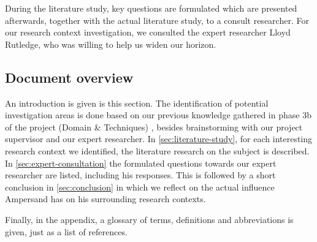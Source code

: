 During the literature study, key questions are formulated which are presented afterwards, together with the actual literature study, to a consult researcher.
For our research context investigation, we consulted the expert researcher Lloyd Rutledge, who was willing to help us widen our horizon.


\subsection{Document overview}
An introduction is given is this section.
The identification of potential investigation areas is done based on our previous knowledge gathered in phase 3b of the project (Domain \& Techniques) , besides brainstorming with our project supervisor and our expert researcher.
In \autoref{sec:literature-study}, for each interesting research context we identified, the literature research on the subject is described.
In \autoref{sec:expert-consultation} the formulated questions towards our expert researcher are listed, including his responses.
This is followed by a short conclusion in \autoref{sec:conclusion} in which we reflect on the actual influence Ampersand has on his surrounding research contexts.

Finally, in the appendix, a glossary of terms, definitions and abbreviations is given, just as a list of references.
